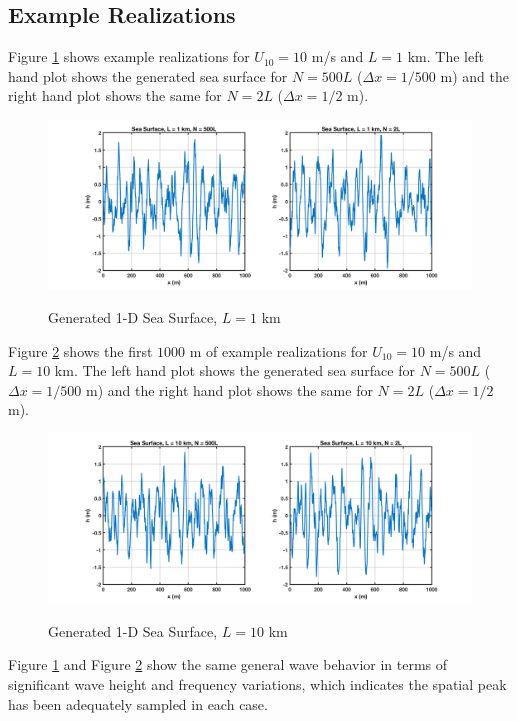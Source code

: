 \subsection{Example Realizations}
Figure \ref{os_fig:7a} shows example realizations for $U_{10} = 10$ m/s and $L = 1$ km. The left hand plot shows the generated sea surface for $N = 500L$ ($\Delta x = 1/500$ m) and the right hand plot shows the same for $N=2L$ ($\Delta x = 1/2$ m).
\begin{figure}[H]
  \begin{center}
\includegraphics[width=6in]{../media/Ocean_Surface/sea_surface_1000.png}
  \end{center}
  \renewcommand{\baselinestretch}{1} \small\normalsize
  \begin{quote}
    \caption[Generated 1-D Sea Surface, $L = 1$ km]{Generated 1-D Sea Surface, $L = 1$ km\label{os_fig:7a}}
  \end{quote}
\end{figure}
\renewcommand{\baselinestretch}{2} \small\normalsize

Figure \ref{os_fig:7aa} shows the first $1000$ m of example realizations for $U_{10} = 10$ m/s and $L = 10$ km. The left hand plot shows the generated sea surface for $N = 500L$ ($\Delta x = 1/500$ m) and the right hand plot shows the same for $N=2L$ ($\Delta x = 1/2$ m).
\begin{figure}[H]
  \begin{center}
\includegraphics[width=6in]{../media/Ocean_Surface/sea_surface_10000.png}
  \end{center}
  \renewcommand{\baselinestretch}{1} \small\normalsize
  \begin{quote}
    \caption[Generated 1-D Sea Surface, $L = 10$ km]{Generated 1-D Sea Surface, $L = 10$ km\label{os_fig:7aa}}
  \end{quote}
\end{figure}
\renewcommand{\baselinestretch}{2} \small\normalsize
Figure \ref{os_fig:7a} and Figure \ref{os_fig:7aa} show the same general wave behavior in terms of significant wave height and frequency variations, which indicates the spatial peak has been adequately sampled in each case.

